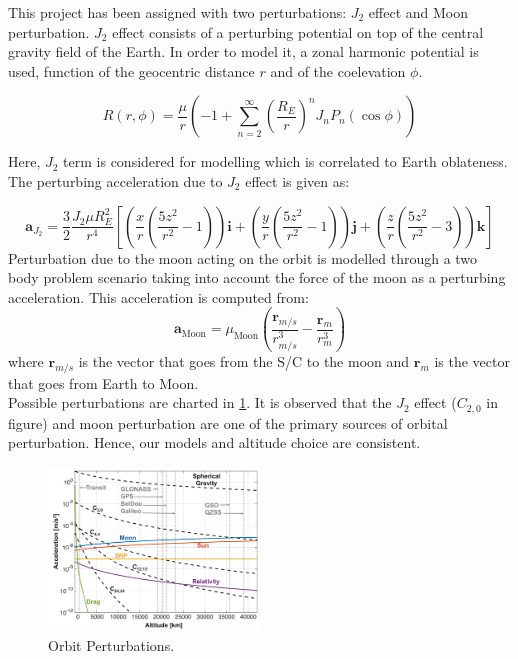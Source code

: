 \documentclass{article}
\begin{document}
This project has been assigned with two perturbations: \( J_2 \) effect and Moon perturbation. \( J_2 \) effect consists of a perturbing potential on top of the central gravity field of the Earth. In order to model it, a zonal harmonic potential is used, function of the geocentric distance \( r \) and of the coelevation \( \phi \).

\begin{equation*}
	R(r, \phi) = \frac{\mu}{r} \left( -1 + \sum_{n=2}^{\infty} \left( \frac{R_E}{r} \right)^n J_n P_n(\cos\phi) \right)
\end{equation*}

Here, \( J_2 \) term is considered for modelling which is correlated to Earth oblateness. The perturbing acceleration due to \( J_2 \) effect is given as:

\begin{equation*}
	\mathbf{a}_{J_2} = \frac{3}{2} \frac{J_2 \mu R_E^2}{r^4} \left[ \left( \frac{x}{r} \left( \frac{5z^2}{r^2} - 1 \right) \right) \mathbf{i} + \left( \frac{y}{r} \left( \frac{5z^2}{r^2} - 1 \right) \right) \mathbf{j} + \left( \frac{z}{r} \left( \frac{5z^2}{r^2} - 3 \right) \right) \mathbf{k} \right]
\end{equation*}
Perturbation due to the moon acting on the orbit is modelled through a two body problem scenario taking into account the force of the moon as a perturbing acceleration. This acceleration is computed from:
\begin{equation*}
	\label{eq:moon_perturbation}
	\mathbf{a}_{\text{Moon}} = \mu_{\text{Moon}}
	\left( \frac{\mathbf{r}_{m/s}}{r_{m/s}^3} - \frac{\mathbf{r}_m}{r_m^3} \right)
\end{equation*}
where \( \mathbf{r}_{m/s} \) is the vector that goes from the S/C to the moon and \( \mathbf{r}_m \) is the vector that goes from Earth to Moon.\\ 

Possible perturbations are charted in \ref{fig:orbit perturbations}. It is observed that the \( J_2 \) effect (\( C_{2,0} \) in figure) and moon perturbation are one of the primary sources of orbital perturbation. Hence, our models and altitude choice are consistent.   

\begin{figure}[H]
	\centering
	\includegraphics[width=0.5\textwidth]{Perturbation chart.png}
	\caption{Orbit Perturbations.}
	\label{fig:orbit perturbations}
\end{figure}
\end{document}
